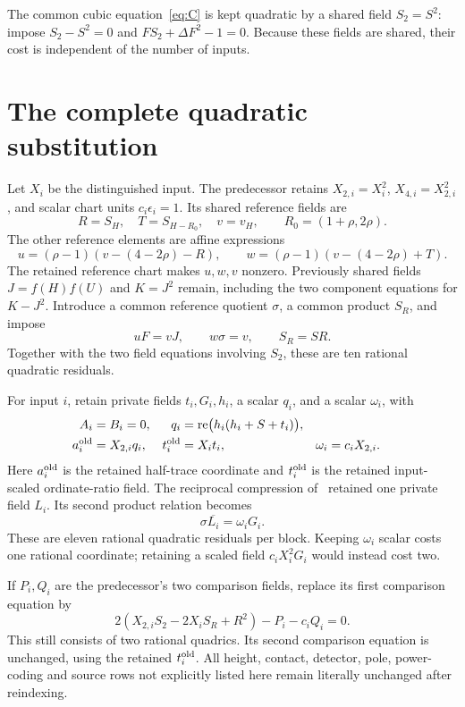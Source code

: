 \documentclass[11pt]{article}
\newcommand{\re}{\operatorname{re}}
\begin{document}
The common cubic equation~\eqref{eq:C} is kept quadratic by a shared
field \(S_2=S^2\): impose \(S_2-S^2=0\) and
\(FS_2+\Delta F^2-1=0\). Because these fields are shared, their cost
is independent of the number of inputs.

\section{The complete quadratic substitution}

Let \(X_i\) be the distinguished input. The predecessor retains
\(X_{2,i}=X_i^2\), \(X_{4,i}=X_{2,i}^2\), and scalar chart units
\(c_i\epsilon_i=1\). Its shared reference fields are
\[
 R=S_H,\quad T=S_{H-R_0},\quad v=v_H,
 \qquad R_0=(1+\rho,2\rho).
\]
The other reference elements are affine expressions
\[
 u=(\rho-1)(v-(4-2\rho)-R),\qquad
 w=(\rho-1)(v-(4-2\rho)+T).
\]
The retained reference chart makes \(u,w,v\) nonzero. Previously shared
fields \(J=f(H)f(U)\) and \(K=J^2\) remain, including the two
component equations for \(K-J^2\). Introduce a common reference
quotient \(\sigma\), a common product \(S_R\), and impose
\begin{equation}\label{eq:common}
       uF=vJ,\qquad w\sigma=v,\qquad S_R=SR.
\end{equation}
Together with the two field equations involving \(S_2\), these are
ten rational quadratic residuals.

For input \(i\), retain private fields \(t_i,G_i,h_i\), a scalar
\(q_i\), and a scalar \(\omega_i\), with
\begin{align}
 A_i&=B_i=0, &
 q_i&=\re\bigl(h_i(h_i+S+t_i)\bigr), \label{eq:private}\\
 a_i^{\rm old}&=X_{2,i}q_i, &
 t_i^{\rm old}&=X_it_i, &
 \omega_i&=c_iX_{2,i}. \label{eq:scaleout}
\end{align}
Here \(a_i^{\rm old}\) is the retained half-trace coordinate and
\(t_i^{\rm old}\) is the retained input-scaled ordinate-ratio field.
The reciprocal compression of~\cite{common} retained one private field
\(L_i\). Its second product relation becomes
\begin{equation}\label{eq:reciprocal}
                    \sigma\overline{L_i}=\omega_iG_i.
\end{equation}
These are eleven rational quadratic residuals per block. Keeping
\(\omega_i\) scalar costs one rational coordinate; retaining a scaled
field \(c_iX_i^2G_i\) would instead cost two.

If \(P_i,Q_i\) are the predecessor's two comparison fields, replace
its first comparison equation by
\begin{equation}\label{eq:comparison}
        2(X_{2,i}S_2-2X_iS_R+R^2)-P_i-c_iQ_i=0.
\end{equation}
This still consists of two rational quadrics. Its second comparison
equation is unchanged, using the retained \(t_i^{\rm old}\). All
height, contact, detector, pole, power-coding and source rows not
explicitly listed here remain literally unchanged after reindexing.
\end{document}
